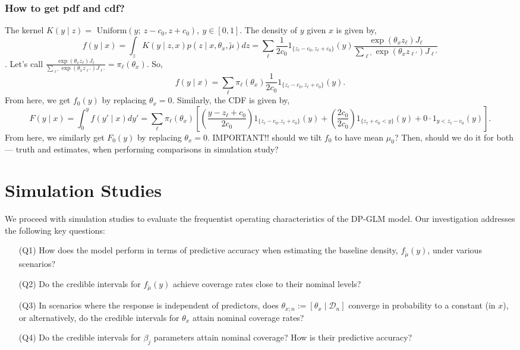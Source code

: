 \documentclass[10pt, oneside]{article}   	%
\newcommand{\tmu}{\widetilde{\mu}}
\begin{document}
\subsubsection{How to get pdf and cdf?}
\label{sec:pdf-cdf}
The kernel $K(y \mid z) = \text{ Uniform}(y; \ z - c_0, z + c_0), \ y \in [0, 1]$. The density of $y$ given $x$ is given by,
$$f(y \mid x) = \int_z K(y \mid z, x) p(z \mid x, \theta_{x}, \tilde \mu) dz = \sum_{\ell} \frac{1}{2c_0} 1_{\{z_\ell - c_0 , z_\ell + c_0\}}(y) \frac{\exp(\theta_x z_\ell) J_\ell}{\sum_{\ell'}\exp(\theta_x z_{\ell'}) J_{\ell'}}
$$. Let's call 
$\frac{\exp(\theta_x z_\ell) J_\ell}{\sum_{\ell'}\exp(\theta_x z_{\ell'}) J_{\ell'}} = \pi_{\ell}(\theta_x)
$. So, $$f(y \mid x) = \sum_{\ell} \pi_{\ell}(\theta_x) \frac{1}{2c_0} 1_{\{z_\ell - c_0 , z_\ell + c_0\}}(y).$$ From here, we get $f_0(y)$ by replacing $\theta_x = 0$. Similarly, the CDF is given by, 
$$F(y \mid x) = \int_{0}^{y} f(y' \mid x) dy' = \sum_{\ell} \pi_\ell(\theta_x) \left[\left(\frac{y - z_\ell + c_0}{2c_0}\right) 1_{\{z_\ell - c_0,  z_\ell + c_0\}}(y) + \left(\frac{2c_0}{2c_0}\right) 1_{\{z_\ell + c_0 < y\}}(y) + 0 \cdot 1_{y < z_\ell - c_0}(y) \right].$$ From here, we similarly get $F_0(y)$ by replacing $\theta_x = 0$. \color{red} IMPORTANT!! \color{black} should we tilt $f_0$ to have mean $\mu_0$? Then, should we do it for both --- truth and estimates, when performing comparisons in simulation study? 

\section{Simulation Studies}
\label{sec:sim}
We proceed with simulation studies to evaluate the frequentist operating characteristics of the DP-GLM model. Our investigation addresses the following key questions: 
\begin{enumerate}
\item[(Q1)] How does the model perform in terms of predictive accuracy when estimating the baseline density, $f_{\tmu}(y)$, under various scenarios? 
\item[(Q2)] Do the credible intervals for $f_{\tmu}(y)$ achieve coverage rates close to their nominal levels? 
\item[(Q3)] In scenarios where the response is independent of predictors, does $\theta_{x; n} := [\theta_x \mid \mathcal{D}_n]$ converge in probability to a constant (in $x$), or alternatively, do the credible intervals for $\theta_x$ attain nominal coverage rates? 
\item[(Q4)] Do the credible intervals for $\beta_j$ parameters attain nominal coverage? How is their predictive accuracy?
\end{enumerate}
\end{document}
